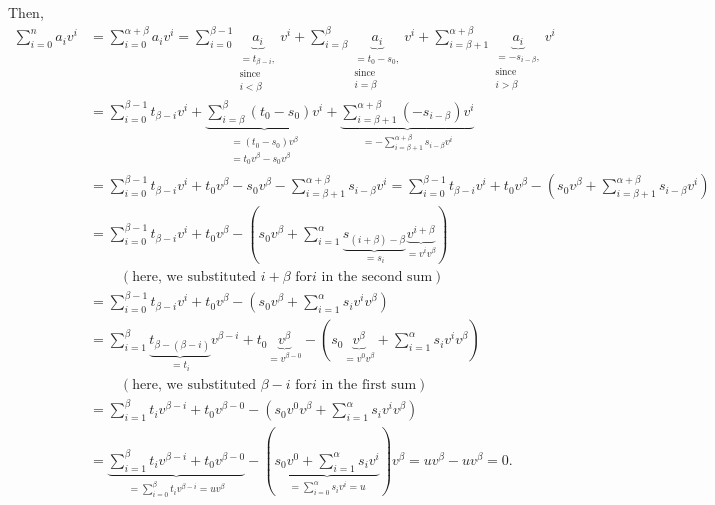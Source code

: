 \documentclass[12pt,final,notitlepage,onecolumn]{article}%
\begin{document}
Then,%
\begin{align*}
\sum\limits_{i=0}^{n}a_{i}v^{i}  &  =\sum\limits_{i=0}^{\alpha+\beta}%
a_{i}v^{i}=\sum\limits_{i=0}^{\beta-1}\underbrace{a_{i}}_{\substack{=t_{\beta
-i},\\\text{since}\\i<\beta}}v^{i}+\sum\limits_{i=\beta}^{\beta}%
\underbrace{a_{i}}_{\substack{=t_{0}-s_{0},\\\text{since}\\i=\beta}}v^{i}%
+\sum\limits_{i=\beta+1}^{\alpha+\beta}\underbrace{a_{i}}%
_{\substack{=-s_{i-\beta},\\\text{since}\\i>\beta}}v^{i}\\
&  =\sum\limits_{i=0}^{\beta-1}t_{\beta-i}v^{i}+\underbrace{\sum
\limits_{i=\beta}^{\beta}\left(  t_{0}-s_{0}\right)  v^{i}}%
_{\substack{=\left(  t_{0}-s_{0}\right)  v^{\beta}\\=t_{0}v^{\beta}%
-s_{0}v^{\beta}}}+\underbrace{\sum\limits_{i=\beta+1}^{\alpha+\beta}\left(
-s_{i-\beta}\right)  v^{i}}_{=-\sum\limits_{i=\beta+1}^{\alpha+\beta
}s_{i-\beta}v^{i}}\\
&  =\sum\limits_{i=0}^{\beta-1}t_{\beta-i}v^{i}+t_{0}v^{\beta}-s_{0}v^{\beta
}-\sum\limits_{i=\beta+1}^{\alpha+\beta}s_{i-\beta}v^{i}=\sum\limits_{i=0}%
^{\beta-1}t_{\beta-i}v^{i}+t_{0}v^{\beta}-\left(  s_{0}v^{\beta}%
+\sum\limits_{i=\beta+1}^{\alpha+\beta}s_{i-\beta}v^{i}\right) \\
&  =\sum\limits_{i=0}^{\beta-1}t_{\beta-i}v^{i}+t_{0}v^{\beta}-\left(
s_{0}v^{\beta}+\sum\limits_{i=1}^{\alpha}\underbrace{s_{\left(  i+\beta
\right)  -\beta}}_{=s_{i}}\underbrace{v^{i+\beta}}_{=v^{i}v^{\beta}}\right) \\
&  \ \ \ \ \ \ \ \ \ \ \left(  \text{here, we substituted }i+\beta\text{ for
}i\text{ in the second sum}\right) \\
&  =\sum\limits_{i=0}^{\beta-1}t_{\beta-i}v^{i}+t_{0}v^{\beta}-\left(
s_{0}v^{\beta}+\sum\limits_{i=1}^{\alpha}s_{i}v^{i}v^{\beta}\right) \\
&  =\sum\limits_{i=1}^{\beta}\underbrace{t_{\beta-\left(  \beta-i\right)  }%
}_{=t_{i}}v^{\beta-i}+t_{0}\underbrace{v^{\beta}}_{=v^{\beta-0}}-\left(
s_{0}\underbrace{v^{\beta}}_{=v^{0}v^{\beta}}+\sum\limits_{i=1}^{\alpha}%
s_{i}v^{i}v^{\beta}\right) \\
&  \ \ \ \ \ \ \ \ \ \ \left(  \text{here, we substituted }\beta-i\text{ for
}i\text{ in the first sum}\right) \\
&  =\sum\limits_{i=1}^{\beta}t_{i}v^{\beta-i}+t_{0}v^{\beta-0}-\left(
s_{0}v^{0}v^{\beta}+\sum\limits_{i=1}^{\alpha}s_{i}v^{i}v^{\beta}\right) \\
&  =\underbrace{\sum\limits_{i=1}^{\beta}t_{i}v^{\beta-i}+t_{0}v^{\beta-0}%
}_{=\sum\limits_{i=0}^{\beta}t_{i}v^{\beta-i}=uv^{\beta}}-\left(
\underbrace{s_{0}v^{0}+\sum\limits_{i=1}^{\alpha}s_{i}v^{i}}_{=\sum
\limits_{i=0}^{\alpha}s_{i}v^{i}=u}\right)  v^{\beta}=uv^{\beta}-uv^{\beta}=0.
\end{align*}
\end{document}
